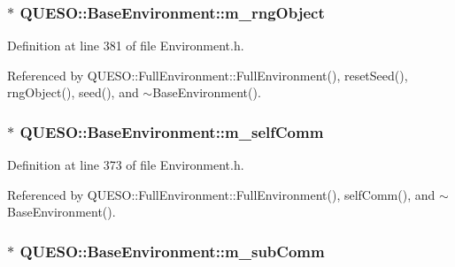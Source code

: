 \hypertarget{class_q_u_e_s_o_1_1_base_environment_a5e80f48ab043b532ee9d4864cd363574}{
\subsubsection[{m\-\_\-rng\-Object}]{$\ast$ Q\-U\-E\-S\-O\-::\-Base\-Environment\-::m\-\_\-rng\-Object\hspace{0.3cm}{\ttfamily [protected]}}}\label{class_q_u_e_s_o_1_1_base_environment_a5e80f48ab043b532ee9d4864cd363574}


Definition at line 381 of file Environment.\-h.



Referenced by Q\-U\-E\-S\-O\-::\-Full\-Environment\-::\-Full\-Environment(), reset\-Seed(), rng\-Object(), seed(), and $\sim$\-Base\-Environment().

\hypertarget{class_q_u_e_s_o_1_1_base_environment_a8f1159427c10aa4dfee51936d46103da}{
\subsubsection[{m\-\_\-self\-Comm}]{$\ast$ Q\-U\-E\-S\-O\-::\-Base\-Environment\-::m\-\_\-self\-Comm\hspace{0.3cm}{\ttfamily [protected]}}}\label{class_q_u_e_s_o_1_1_base_environment_a8f1159427c10aa4dfee51936d46103da}


Definition at line 373 of file Environment.\-h.



Referenced by Q\-U\-E\-S\-O\-::\-Full\-Environment\-::\-Full\-Environment(), self\-Comm(), and $\sim$\-Base\-Environment().

\hypertarget{class_q_u_e_s_o_1_1_base_environment_ac8d7b6062d9a58ef1a36eb95753498b4}{
\subsubsection[{m\-\_\-sub\-Comm}]{$\ast$ Q\-U\-E\-S\-O\-::\-Base\-Environment\-::m\-\_\-sub\-Comm\hspace{0.3cm}{\ttfamily [protected]}}}\label{class_q_u_e_s_o_1_1_base_environment_ac8d7b6062d9a58ef1a36eb95753498b4}


